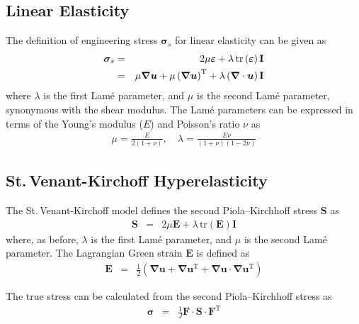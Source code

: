 \documentclass[sn-mathphys,Numbered]{sn-jnl}%
\newcommand{\bb}{\boldsymbol}
\begin{document}
\begin{appendices}
\subsection{Linear Elasticity}
The definition of engineering stress $\bb{\sigma}_s$ for linear elasticity can be given as
\begin{eqnarray}  \label{eq:linearElastic}
	\bb{\sigma}_s
	&=& 2 \mu \bb{\varepsilon} + \lambda \, \text{tr} \left( \bb{\varepsilon} \right) \textbf{I} \notag \\
	&=& \mu \bb{\nabla} \bb{u} + \mu \left( \bb{\nabla} \bb{u}\right)^{\text{T}} + \lambda \left(\bb{\nabla} \cdot \bb{u} \right) \textbf{I}
\end{eqnarray}
where $\lambda$ is the first Lam\'{e} parameter, and $\mu$ is the second Lam\'{e} parameter, synonymous with the shear modulus.
The Lam\'{e} parameters can be expressed in terms of the Young's modulus ($E$) and Poisson's ratio $\nu$ as
\begin{eqnarray}
	\mu = \frac{E}{2(1 + \nu)}, \quad \lambda = \frac{E \nu}{(1+\nu)(1 - 2\nu)}
\end{eqnarray}

\subsection{St.\,Venant-Kirchoff Hyperelasticity}
The St.\,Venant-Kirchoff model defines the second Piola–Kirchhoff stress $\textbf{S}$ as
\begin{eqnarray}
	\bb{S} &=& 2 \mu \bb{E} + \lambda \, \text{tr} \left( \bb{E} \right) \textbf{I}
\end{eqnarray}
where, as before, $\lambda$ is the first Lam\'{e} parameter, and $\mu$ is the second Lam\'{e} parameter.
The Lagrangian Green strain $\textbf{E}$ is defined as
\begin{eqnarray}
	\bb{E} &=& \frac{1}{2} \left( \bb{\nabla} \bb{u} + \bb{\nabla} \bb{u}^{\text{T}} + \bb{\nabla} \bb{u} \cdot \bb{\nabla} \bb{u}^{\text{T}}  \right)
\end{eqnarray}

The true stress can be calculated from the second Piola–Kirchhoff stress as
\begin{eqnarray} \label{eq:S2sigma}
	\bb{\sigma} &=& \frac{1}{J} \bb{F} \cdot \bb{S} \cdot \bb{F}^{\text{T}}
\end{eqnarray}




\end{appendices}
\end{document}
